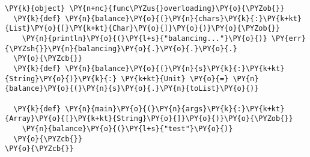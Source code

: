 \begin{Verbatim}[commandchars=\\\{\}]
\PY{k}{object} \PY{n+nc}{func\PYZus{}overloading}\PY{o}{\PYZob{}}
  \PY{k}{def} \PY{n}{balance}\PY{o}{(}\PY{n}{chars}\PY{k}{:}\PY{k+kt}{List}\PY{o}{[}\PY{k+kt}{Char}\PY{o}{]}\PY{o}{)}\PY{o}{\PYZob{}}
    \PY{n}{println}\PY{o}{(}\PY{l+s}{"balancing..."}\PY{o}{)} \PY{err}{\PYZsh{}}\PY{n}{balancing}\PY{o}{.}\PY{o}{.}\PY{o}{.}
  \PY{o}{\PYZcb{}}
  \PY{k}{def} \PY{n}{balance}\PY{o}{(}\PY{n}{s}\PY{k}{:}\PY{k+kt}{String}\PY{o}{)}\PY{k}{:} \PY{k+kt}{Unit} \PY{o}{=} \PY{n}{balance}\PY{o}{(}\PY{n}{s}\PY{o}{.}\PY{n}{toList}\PY{o}{)}

  \PY{k}{def} \PY{n}{main}\PY{o}{(}\PY{n}{args}\PY{k}{:}\PY{k+kt}{Array}\PY{o}{[}\PY{k+kt}{String}\PY{o}{]}\PY{o}{)}\PY{o}{\PYZob{}}
    \PY{n}{balance}\PY{o}{(}\PY{l+s}{"test"}\PY{o}{)}
  \PY{o}{\PYZcb{}}
\PY{o}{\PYZcb{}}
\end{Verbatim}
